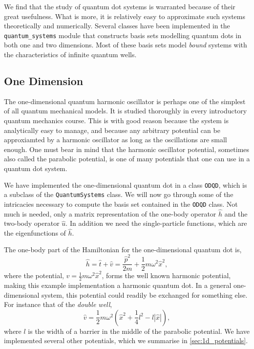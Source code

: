 We find that the study of quantum dot systems is warranted because of their great usefulness.
What is more, it is relatively easy to approximate such systems theoretically and 
numerically. 
Several classes have been implemented in the \lstinline{quantum_systems} module
that constructs basis sets modelling 
quantum dots in both one and two dimensions. Most of these basis sets model \emph{bound} systems
with the characteristics of infinite quantum wells. 

\subsection{One Dimension}

The one-dimensional quantum harmonic oscillator is perhaps one of the simplest of
all quantum mechanical models. It is studied thoroughly in every introductory quantum 
mechanics course. This is with good reason because the system is analytically easy to
manage, and because 
any arbitrary potential can be approxiamted by a harmonic oscillator as long 
as the oscillations are small enough.
One must bear in 
mind that the harmonic oscillator potential, sometimes also called the parabolic potential, 
is one of many potentials that one can use in a quantum dot system.

We have implemented 
the one-dimensional quantum dot in a class \lstinline{ODQD}, which is a subclass of 
the \lstinline{QuantumSystems} class. We will now go through some of the intricacies 
necessary to compute the basis set contained in the \lstinline{ODQD} class. Not much is 
needed, only a matrix representation of the one-body operator $\hat{h}$ and the two-body 
operator $\hat{u}$. In addition we need the single-particle functions, which are the 
eigenfunctions of $\hat{h}$.

The one-body part of the Hamiltonian for the one-dimensional quantum 
dot is,
\begin{equation}
    \label{eq:1d_ho_hamiltonian}
    \hat{h} = \hat{t} + \hat{v} = \frac{\hat{p}^2}{2m} + \frac{1}{2}m \omega^2\hat{x}^2,
\end{equation}
where the potential, $\hat{v} = \frac{1}{2}m \omega^2\hat{x}^2$, forms the well known 
harmonic potential, making this example implementation a harmonic quantum dot.
In a general one-dimensional system, this potential could 
readily be exchanged for something else. For instance that of the 
\emph{double well},
\begin{equation}
    \hat{v} = \frac{1}{2} m \omega^2
        \left(\hat{x}^2 + \frac{1}{4}l^2 - l |\hat{x}|\right),
\end{equation}
where $l$ is the width of a barrier in the middle of the parabolic 
potential. We have implemented several other potentials, which we summarise 
in \autoref{sec:1d_potentials}.


